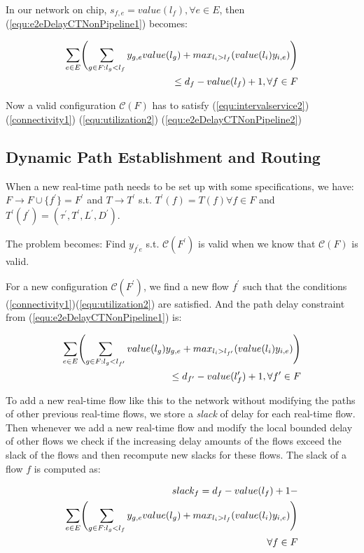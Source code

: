 \documentclass[conference, twocolumn]{IEEEtran}
\theoremstyle{definition}
\begin{document}
In our network on chip, $s_{f,e} = value(l_f),\forall e
\in E$, then (\ref{equ:e2eDelayCTNonPipeline1}) becomes:

\begin{eqnarray}\label{equ:e2eDelayCTNonPipeline2}
\sum_{e \in E} \Biggl(\sum_{g \in F:l_g <
l_f}y_{g,e}value(l_g) +max_{l_i>l_f}(value(l_i)y_{i,e})\Biggr)\notag \\ \leq
d_f-value(l_f) + 1, \forall f \in F
\end{eqnarray}

Now a valid configuration ${\mathcal C}(F)$ has to satisfy
(\ref{equ:intervalservice2})(\ref{connectivity1}) (\ref{equ:utilization2})
(\ref{equ:e2eDelayCTNonPipeline2})

\subsection{Dynamic Path Establishment and Routing}
When a new real-time path needs to be set up with some specifications, we have:
$F \rightarrow F \cup \{f^{'} \}=F^{'}$
and $T \rightarrow T^{'}$ s.t. $T^{'} (f)=T(f)\forall f \in F$ and $T^{'}
(f^{'})=(\tau ^{'}, T^{'}, L^{'}, D^{'})$.

The problem becomes: Find $y_{f^{'}e}$ s.t. ${\mathcal C}(F^{'})$ is valid
when we know that ${\mathcal C}(F)$ is valid.

For a new configuration ${\mathcal C}(F^{'})$, we find a new flow $f^{'}$ such
that the conditions (\ref{connectivity1})(\ref{equ:utilization2}) are satisfied. And
the path delay constraint from (\ref{equ:e2eDelayCTNonPipeline1}) is:

\begin{eqnarray}\label{equ:e2eDelayNewPath1}
\sum_{e \in E} \Biggl(\sum_{g \in F:l_g <
l_{f'}}value(l_g)y_{g,e} +max_{l_i>l_{f'}}(value(l_i)y_{i,e})\Biggr)\notag \\
\leq d_{f'}-value(l_f') + 1, \forall f' \in F
\end{eqnarray}

To add a new real-time flow like this to the network without modifying the paths
of other previous real-time flows, we store a {\em slack} of delay for each
real-time flow. Then whenever we add a new real-time flow and modify the local
bounded delay of other flows we check if the increasing delay amounts of the
flows exceed the slack of the flows and then recompute new slacks for these
flows. The slack of a flow $f$ is computed as:

\begin{eqnarray}\label{equ:slack1}
	slack_f= d_f-value(l_f) + 1 - \notag \\
	\sum_{e \in E} \Biggl(\sum_{g \in F:l_g < l_f}y_{g,e}value(l_g)
	+max_{l_i>l_f}(value(l_i)y_{i,e})\Biggr) \notag \\ 
	\forall f \in F
\end{eqnarray}
\end{document}
